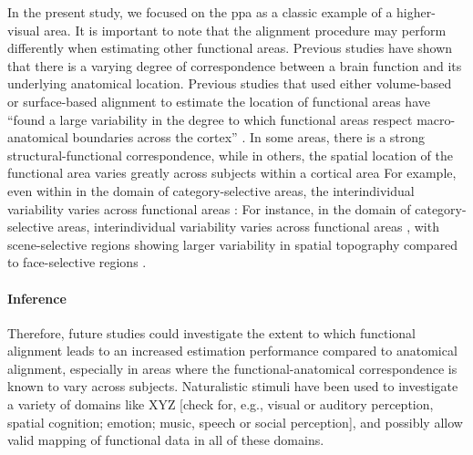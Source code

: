 %
In the present study, we focused on the \ac{ppa} as a classic example of a
higher-visual area.
%
It is important to note that the alignment procedure may perform differently
when estimating other functional areas.
Previous studies have shown that there is a varying degree of correspondence
between a brain function and its underlying anatomical location.
%
Previous studies that used either volume-based \citep{zhen2017quantifying,
zhen2015quantifying} or surface-based alignment \citep{rosenke2021probabilistic,
frost2012measuring} to estimate the location of functional areas have ``found a
large variability in the degree to which functional areas respect
macro-anatomical boundaries across the cortex'' \citep{frost2012measuring}.
%
In some areas, there is a strong structural-functional correspondence, while in
others, the spatial location of the functional area varies greatly across
subjects within a cortical area \citep{frost2012measuring}
%
For example, even within in the domain of category-selective areas, the
interindividual variability varies across functional areas
\citep{zhen2017quantifying, zhen2015quantifying, frost2012measuring}:
%
For instance, in the domain of category-selective areas, interindividual
variability varies across functional areas , with scene-selective regions
showing larger variability in spatial topography compared to face-selective
regions \citep{zhen2017quantifying, frost2012measuring}.


\paragraph{Inference}


%
Therefore, future studies could investigate the extent to which functional
alignment leads to an increased estimation performance compared to anatomical
alignment, especially in areas where the functional-anatomical correspondence is
known to vary across subjects.
%
Naturalistic stimuli have been used to investigate a variety of domains like XYZ
[check for, e.g., visual or auditory perception, spatial cognition; emotion;
music, speech or social perception], and possibly allow valid mapping of
functional data in all of these domains.


